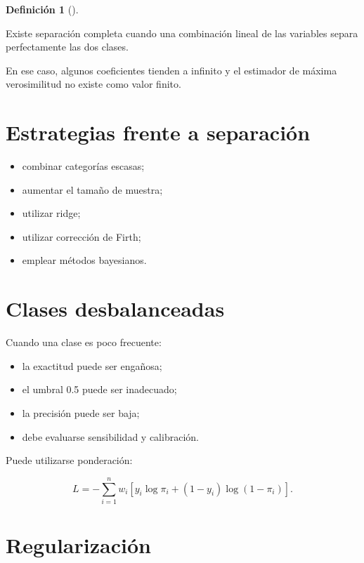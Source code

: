 \documentclass[
  spanish,
  11pt,
  letterpaper,
  DIV=11,
  numbers=noendperiod]{scrreprt}
\providecommand{\tightlist}{%
  \setlength{\itemsep}{0pt}\setlength{\parskip}{0pt}}
\theoremstyle{definition}
\newtheorem{definition}{Definición}[chapter]
\theoremstyle{plain}
\theoremstyle{definition}
\theoremstyle{remark}
\begin{document}
\begin{definition}[]\protect\hypertarget{def-separacion-completa}{}\label{def-separacion-completa}

Existe separación completa cuando una combinación lineal de las
variables separa perfectamente las dos clases.

\end{definition}

En ese caso, algunos coeficientes tienden a infinito y el estimador de
máxima verosimilitud no existe como valor finito.

\section{Estrategias frente a
separación}\label{estrategias-frente-a-separaciuxf3n}

\begin{itemize}
\tightlist
\item
  combinar categorías escasas;
\item
  aumentar el tamaño de muestra;
\item
  utilizar ridge;
\item
  utilizar corrección de Firth;
\item
  emplear métodos bayesianos.
\end{itemize}

\section{Clases desbalanceadas}\label{clases-desbalanceadas}

Cuando una clase es poco frecuente:

\begin{itemize}
\tightlist
\item
  la exactitud puede ser engañosa;
\item
  el umbral 0.5 puede ser inadecuado;
\item
  la precisión puede ser baja;
\item
  debe evaluarse sensibilidad y calibración.
\end{itemize}

Puede utilizarse ponderación:

\[
L
=
-
\sum_{i=1}^{n}
w_i
\left[
y_i\log\pi_i
+
(1-y_i)\log(1-\pi_i)
\right].
\]

\section{Regularización}\label{regularizaciuxf3n-2}
\end{document}
